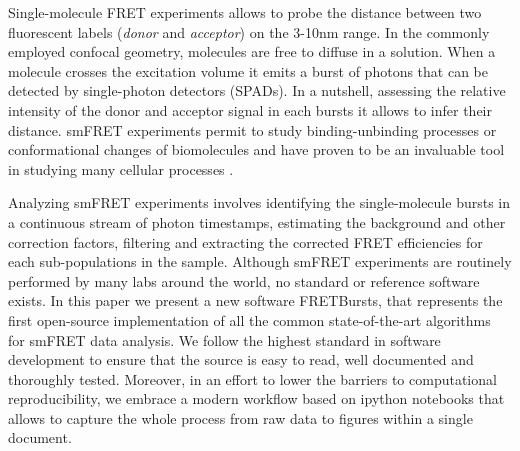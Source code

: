 
Single-molecule FRET experiments allows to probe the distance between two fluorescent labels (\textit{donor} and \textit{acceptor}) on the 3-10nm range. In the commonly employed confocal geometry, molecules are free to diffuse in a solution. When a molecule crosses the excitation volume it emits a burst of photons that can be detected by single-photon detectors (SPADs). In a nutshell, assessing the relative intensity of the donor and acceptor signal in each bursts it allows to infer their distance. smFRET experiments permit to study binding-unbinding processes or conformational changes of biomolecules and have proven to be an invaluable tool in studying many cellular processes \cite{Kapanidis_2006}.

Analyzing smFRET experiments involves identifying the single-molecule bursts in a continuous stream of photon timestamps, estimating the background and other correction factors, filtering and extracting the corrected FRET efficiencies for each sub-populations in the sample. Although smFRET experiments are routinely performed by many labs around the world, no standard or reference software exists. In this paper we present a new software FRETBursts, that represents the first open-source implementation of all the common state-of-the-art algorithms for smFRET data analysis. We follow the highest standard in software development to ensure that the source is easy to read, well documented and thoroughly tested. Moreover, in an effort to lower the barriers to computational reproducibility, we embrace a modern workflow based on ipython notebooks that allows to capture the whole process from raw data to figures within a single document.
